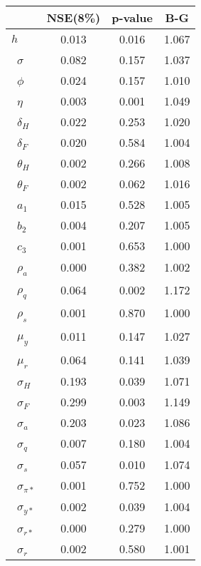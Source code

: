 \begin{tiny}\begin{tabular}{lccc}
\hline
&\textbf{NSE(8\%)}&\textbf{p-value}&\textbf{B-G}\\\hline
\textbf{$ h             $}&0.013&0.016&1.067\\\
\textbf{$ \sigma        $}&0.082&0.157&1.037\\\
\textbf{$ \phi          $}&0.024&0.157&1.010\\\
\textbf{$ \eta          $}&0.003&0.001&1.049\\\
\textbf{$ \delta_{H}    $}&0.022&0.253&1.020\\\
\textbf{$ \delta_{F}    $}&0.020&0.584&1.004\\\
\textbf{$ \theta_{H}    $}&0.002&0.266&1.008\\\
\textbf{$ \theta_{F}    $}&0.002&0.062&1.016\\\
\textbf{$ a_{1}         $}&0.015&0.528&1.005\\\
\textbf{$ b_{2}         $}&0.004&0.207&1.005\\\
\textbf{$ c_{3}         $}&0.001&0.653&1.000\\\
\textbf{$ \rho_{a}      $}&0.000&0.382&1.002\\\
\textbf{$ \rho_{q}      $}&0.064&0.002&1.172\\\
\textbf{$ \rho_{s}      $}&0.001&0.870&1.000\\\
\textbf{$ \mu_{y}       $}&0.011&0.147&1.027\\\
\textbf{$ \mu_{r}       $}&0.064&0.141&1.039\\\
\textbf{$ \sigma_{H}    $}&0.193&0.039&1.071\\\
\textbf{$ \sigma_{F}    $}&0.299&0.003&1.149\\\
\textbf{$ \sigma_{a}    $}&0.203&0.023&1.086\\\
\textbf{$ \sigma_{q}    $}&0.007&0.180&1.004\\\
\textbf{$ \sigma_{s}    $}&0.057&0.010&1.074\\\
\textbf{$ \sigma_{\pi*} $}&0.001&0.752&1.000\\\
\textbf{$ \sigma_{y*}   $}&0.002&0.039&1.004\\\
\textbf{$ \sigma_{r*}   $}&0.000&0.279&1.000\\\
\textbf{$ \sigma_{r}    $}&0.002&0.580&1.001\\\hline
\end{tabular}
\end{tiny}
